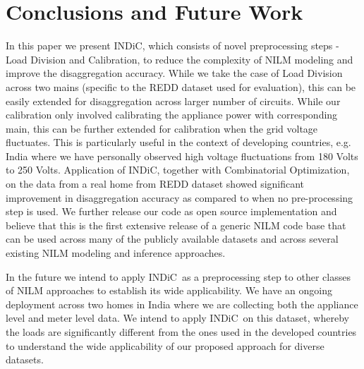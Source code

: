 \documentclass[conference]{IEEEtran}
\newcommand{\indic}{INDiC~}
\newcommand{\indicns}{INDiC}
\begin{document}
\section{Conclusions and Future Work}
\vspace{-1mm}
\noindent In this paper we present \indicns, which consists of novel preprocessing steps - Load Division and Calibration, to reduce the complexity of NILM modeling and improve the disaggregation accuracy. While we take the case of Load Division across two mains (specific to the REDD dataset used for evaluation), this can be easily extended for disaggregation across larger number of circuits. While our calibration only involved calibrating the appliance power with corresponding main, this can be further extended for calibration when the grid voltage fluctuates. This is particularly useful in the context of developing countries, e.g. India where we have personally observed high voltage fluctuations from 180 Volts to 250 Volts. Application of \indicns, together with Combinatorial Optimization, on the data from a real home from REDD dataset showed significant improvement in disaggregation accuracy as compared to when no pre-processing step is used. We further release our code as open source implementation and believe that this is the first extensive release of a generic NILM code base that can be used across many of the publicly available datasets and across several existing NILM modeling and inference approaches. 

\noindent In the future we intend to apply \indic as a preprocessing step to other classes of NILM approaches to establish its wide applicability. We have an ongoing deployment across two homes in India where we are collecting both the appliance level and meter level data. We intend to apply \indic on this dataset, whereby the loads are significantly different from the ones used in the developed countries to understand the wide applicability of our proposed approach for diverse datasets.


\vspace{-6mm}


\end{document}
